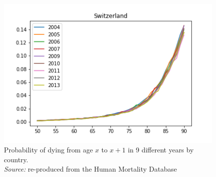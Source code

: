 \begin{figure}[H]
\endminipage\hfill
{}%
  \includegraphics[width=\linewidth]{images/mortality_female_9.png}
\endminipage\hfill
\captionsetup{justification=centering}
\caption{Probability of dying from age $x$ to $x+1$ in 9 different years by country.\\ \textit{Source:} re-produced from the Human Mortality Database}
\label{dying_female}
\end{figure}



